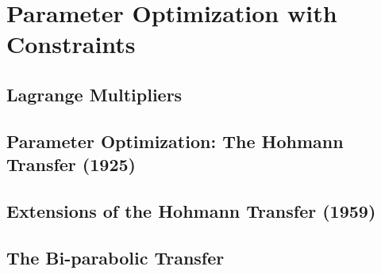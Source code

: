\section{Parameter Optimization with Constraints}



\subsection{Lagrange Multipliers}

\subsection{Parameter Optimization: The Hohmann Transfer (1925)}

\subsection{Extensions of the Hohmann Transfer (1959)}

\subsection{The Bi-parabolic Transfer}
